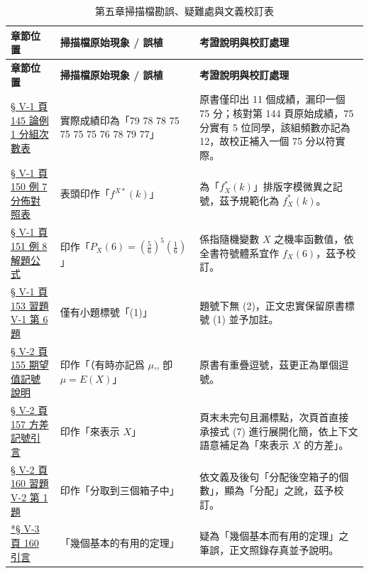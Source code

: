 \documentclass[a4paper,12pt,twoside]{article}
\begin{document}
\small
\renewcommand{\arraystretch}{1.35}
\begin{xltabular}{\textwidth}{|p{3.2cm}|p{3.8cm}|X|}
\caption{第五章掃描檔勘誤、疑難處與文義校訂表}\label{tab:errata_b5_ch5} \\
\hline
\textbf{章節位置} & \textbf{掃描檔原始現象 / 誤植} & \textbf{考證說明與校訂處理} \\ \hline
\endfirsthead
\hline
\textbf{章節位置} & \textbf{掃描檔原始現象 / 誤植} & \textbf{考證說明與校訂處理} \\ \hline
\endhead
\hline
\endfoot

\hyperref[note:b5s-ch5-p145-75]{§ V-1 頁 145 論例 1 分組次數表} & 
實際成績印為「79 78 78 75 75 75 75 76 78 79 77」 & 
原書僅印出 11 個成績，漏印一個 75 分；核對第 144 頁原始成績，75 分實有 5 位同學，該組頻數亦記為 12，故校正補入一個 75 分以符實際。 \\ \hline

\hyperref[note:b5s-ch5-p150-fxstar]{§ V-1 頁 150 例 7 分佈對照表} & 
表頭印作「$f^{X*}(k)$」 & 
為「$f_X^*(k)$」排版字模微異之記號，茲予規範化為 $f_X^*(k)$。 \\ \hline

\hyperref[note:b5s-ch5-p151-px6]{§ V-1 頁 151 例 8 解題公式} & 
印作「$P_X(6) = \left(\frac{5}{6}\right)^5 \left(\frac{1}{6}\right)$」 & 
係指隨機變數 $X$ 之機率函數值，依全書符號體系宜作 $f_X(6)$，茲予校訂。 \\ \hline

\hyperref[note:b5s-ch5-p153-q6]{§ V-1 頁 153 習題 V-1 第 6 題} & 
僅有小題標號「(1)」 & 
題號下無 (2)，正文忠實保留原書標號 (1) 並予加註。 \\ \hline

\hyperref[note:b5s-ch5-p155-doubled-comma]{§ V-2 頁 155 期望值記號說明} & 
印作「（有時亦記爲 $\mu$,, 卽 $\mu=E(X)$」 & 
原書有重疊逗號，茲更正為單個逗號。 \\ \hline

\hyperref[note:b5s-ch5-p157-fangcha]{§ V-2 頁 157 方差記號引言} & 
印作「來表示 $X$」 & 
頁末未完句且漏標點，次頁首直接承接式 (7) 進行展開化簡，依上下文語意補足為「來表示 $X$ 的方差」。 \\ \hline

\hyperref[note:b5s-ch5-p160-fenpei]{§ V-2 頁 160 習題 V-2 第 1 題} & 
印作「分取到三個箱子中」 & 
依文義及後句「分配後空箱子的個數」，顯為「分配」之訛，茲予校訂。 \\ \hline

\hyperref[note:b5s-ch5-p160-typo]{*§ V-3 頁 160 引言} & 
「幾個基本的有用的定理」 & 
疑為「幾個基本而有用的定理」之筆誤，正文照錄存真並予說明。 \\ \hline


\end{xltabular}
\end{document}
